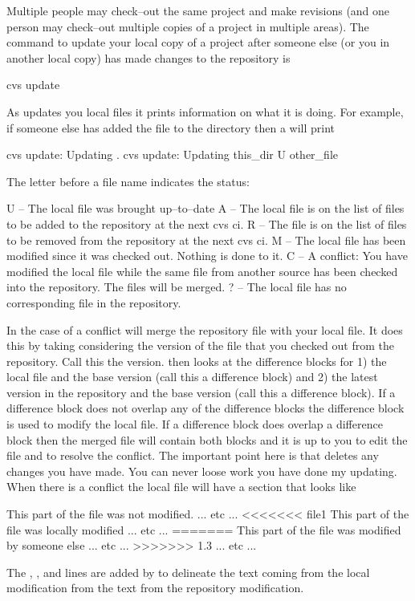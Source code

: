 Multiple people may check--out the same project and make revisions
(and one person may check--out multiple copies of a project in
multiple areas). The command to update your local copy of a project
after someone else (or you in another local copy) has made changes to
the repository is
\begin{example}
  cvs update
\end{example}
As \cvs updates you local files it prints information on what it is
doing. For example, if someone else has added the file 
to the  directory then a  will print
\begin{example}
  cvs update: Updating .
  cvs update: Updating this_dir
  U other_file
\end{example}
The letter before a file name indicates the status:
\begin{example}
  U -- The local file was brought up--to--date
  A -- The local file is on the list of files to be added to the repository
          at the next cvs ci.
  R -- The file is on the list of files to be removed from the repository
          at the next cvs ci.
  M -- The local file has been modified since it was checked out. 
          Nothing is done to it.
  C -- A conflict: You have modified the local file while the same file
          from another source has been checked into the repository.
          The files will be merged.
  ? -- The local file has no corresponding file in the repository.
\end{example}
In the case of a conflict \cvs will merge the repository file with
your local file. It does this by taking considering the version of the
file that you checked out from the repository. Call this the 
version. \cvs then looks at the difference blocks for 1) the local
file and the base version (call this a  difference block)
and 2) the latest version in the repository and the base version (call
this a  difference block). If a 
difference block does not overlap any of the  difference
blocks the difference block is used to modify the local file. If a
 difference block does overlap a  difference
block then the merged file will contain both blocks and it is up to
you to edit the file and to resolve the conflict. The important point
here is that  deletes any changes you have made. You
can never loose work you have done my updating. When there is a
conflict the local file will have a section that looks like
\begin{example}
  This part of the file was not modified.
  ... etc ...
  <<<<<<< file1
  This part of the file was locally modified
  ... etc ...
  =======
  This part of the file was modified by someone else
  ... etc ...
  >>>>>>> 1.3
  ... etc ...
\end{example}
The , \vn{=======}, and  lines are
added by \cvs to delineate the text coming from the local
modification from the text from the repository modification.

